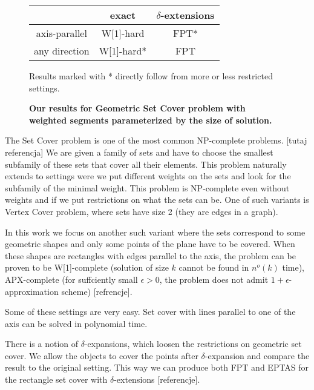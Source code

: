 \begin{figure}[h]
\begin{center}
\begin{tabular}{ | c | c | c | }
\hline
                & exact     & $\delta$-extensions \\ 
\hline                
 axis-parallel   & W[1]-hard & FPT* \\  
\hline                
 any direction   & W[1]-hard* & FPT \\
\hline                
\end{tabular}
\caption{\textbf{Our results for Geometric Set Cover problem with weighted segments 
parameterized by the size of solution.}}

Results marked with * directly follow from more or less restricted settings.
\label{tab:weighted_fpt}
\end{center}
\end{figure}


\iffalse

The Set Cover problem is one of the most common NP-complete problems.
[tutaj referencja]
We are given a family of sets and have to choose the smallest
subfamily of these sets that cover all their elements.
This problem naturally extends to settings
were we put different weights on the sets
and look for the subfamily of the minimal weight.
This problem is NP-complete even 
without weights and if we put
restrictions on what the sets can be.
One of such variants is Vertex Cover problem,
where sets have size 2 (they are edges in a graph).

In this work we focus on another such variant where the sets correspond
to some geometric shapes and
only some points of the plane have to be covered.
When these shapes are rectangles with edges parallel
to the axis, the problem can be proven to
be W[1]-complete (solution of size $k$ cannot be found
in $n^o(k)$ time),
APX-complete (for suffciently small $\epsilon > 0$, the problem
does not admit $1+\epsilon$-approximation scheme)
[refrencje].

Some of these settings are very easy.
Set cover with lines parallel to one of the axis
can be solved in polynomial time.

There is a notion of $\delta$-expansions,
which loosen the restrictions on geometric set cover.
We allow the objects to cover the points
after $\delta$-expansion and compare
the result to the original setting.
This way we can produce both FPT and EPTAS
for the rectangle set cover with $\delta$-extensions
[referencje].



